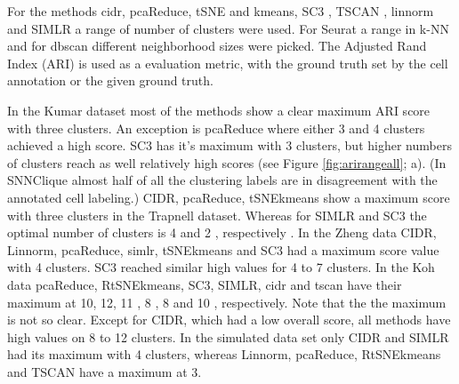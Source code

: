 \documentclass[11pt, a4paper]{article}\usepackage[]{graphicx}\usepackage[]{color}
\begin{document}
For the  methods cidr, pcaReduce, tSNE and kmeans, SC3 , TSCAN , linnorm and SIMLR a range of number of clusters were used. For Seurat a range in k-NN and for dbscan different neighborhood sizes were picked. The Adjusted Rand Index (ARI) is used as a evaluation metric, with the ground truth set by the cell annotation or the given ground truth.

In the Kumar dataset most of the methods show a clear maximum ARI score with three clusters. An exception is pcaReduce where either 3 and 4 clusters achieved a high score. SC3 has it’s maximum with 3 clusters, but higher numbers of clusters reach as well relatively high scores (see Figure \ref{fig:arirangeall}; a). (In SNNClique almost half of all the clustering labels are in disagreement with the annotated cell labeling.)
CIDR, pcaReduce, tSNEkmeans show a maximum score with three clusters in the Trapnell dataset. Whereas for SIMLR and SC3 the optimal number of clusters is 4 and 2 , respectively . 
In the Zheng data CIDR, Linnorm, pcaReduce,  simlr, tSNEkmeans and SC3 had a maximum score value with 4 clusters.  SC3 reached  similar high values for 4 to 7 clusters. In the Koh data pcaReduce, RtSNEkmeans, SC3, SIMLR, cidr and tscan have their maximum at 10, 12, 11 , 8 , 8 and 10 , respectively. Note that the the maximum is not so clear. Except for CIDR, which had a low overall score, all methods have high values on 8 to 12 clusters. In the simulated data set only CIDR and SIMLR had its maximum with 4 clusters, whereas Linnorm, pcaReduce, RtSNEkmeans and TSCAN have a maximum at 3. 
\end{document}
